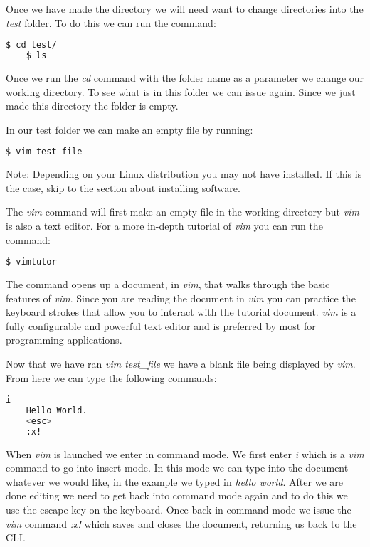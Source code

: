 Once we have made the directory we will need want to change directories into the \emph{test} folder. To do this we can run the \emph{} command:

\begin{lstlisting}[language=bash]  
    $ cd test/
	$ ls
\end{lstlisting}

Once we run the \emph{cd} command with the folder name as a parameter we change our working directory. To see what is in this folder we can issue \emph{} again. Since we just made this directory the folder is empty. 

In our test folder we can make an empty file by running:

\begin{lstlisting}[language=bash] 
    $ vim test_file
\end{lstlisting}

Note: Depending on your Linux distribution you may not have \emph{} installed. If this is the case, skip to the section about installing software.

The \emph{vim} command will first make an empty file in the working directory but \emph{vim} is also a text editor. For a more in-depth tutorial of \emph{vim} you can run the command:

\begin{lstlisting}[language=bash]  
    $ vimtutor
\end{lstlisting}

The \emph{} command opens up a document, in \emph{vim}, that walks through the basic features of \emph{vim}. Since you are reading the document in \emph{vim} you can practice the keyboard strokes that allow you to interact with the tutorial document. \emph{vim} is a fully configurable and powerful text editor and is preferred by most for programming applications. 

Now that we have ran \emph{vim test\_file} we have a blank file being displayed by \emph{vim}. From here we can type the following commands:

\begin{lstlisting}[language=bash]
    i
    Hello World.
    <esc>
    :x!
\end{lstlisting}

When \emph{vim} is launched we enter in command mode. We first enter \emph{i} which is a \emph{vim} command to go into insert mode. In this mode we can type into the document whatever we would like, in the example we typed in \emph{hello world}. After we are done editing we need to get back into command mode again and to do this we use the escape key on the keyboard. Once back in command mode we issue the \emph{vim} command \emph{:x!} which saves and closes the document, returning us back to the \ac{CLI}.	
	
